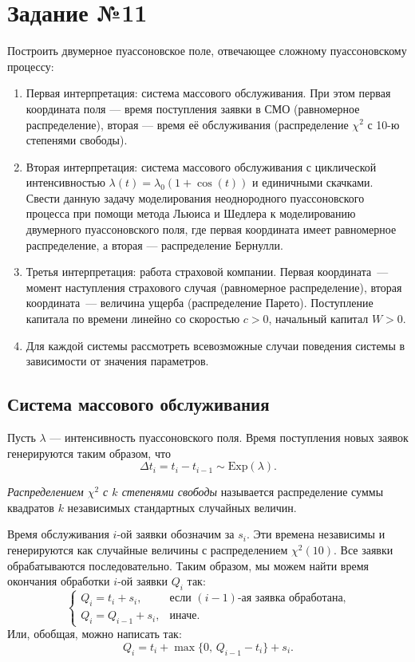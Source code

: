 \section{Задание №11}

Построить двумерное пуассоновское поле, отвечающее сложному пуассоновскому процессу:
\begin{enumerate}
        \item Первая интерпретация: система массового обслуживания. При этом первая координата поля --- время поступления заявки в СМО (равномерное распределение), вторая --- время её обслуживания (распределение $\chi^2$ с 10-ю степенями свободы).
        \item Вторая интерпретация: система массового обслуживания с циклической интенсивностью $\lambda(t) = \lambda_0 (1 + \cos(t))$ и единичными скачками. Свести данную задачу моделирования неоднородного пуассоновского процесса при помощи метода Льюиса и Шедлера к моделированию двумерного пуассоновского поля, где первая координата имеет равномерное распределение, а вторая --- распределение Бернулли.
        \item Третья интерпретация: работа страховой компании. Первая координата~--- момент наступления страхового случая (равномерное распределение), вторая координата~--- величина ущерба (распределение Парето). Поступление капитала по времени линейно со скоростью $c > 0$, начальный капитал $W > 0$.
        \item Для каждой системы рассмотреть всевозможные случаи поведения системы в зависимости от значения параметров.
\end{enumerate}


\subsection{Система массового обслуживания}

Пусть $\lambda$ --- интенсивность пуассоновского поля. Время поступления новых заявок генерируются таким образом, что
$$
        \Delta t_i = t_i - t_{i-1}
        \sim
        \mathrm{Exp}(\lambda).
$$

\begin{definition}
        \textit{Распределением $\chi^2$ с $k$ степенями свободы} называется распределение суммы квадратов $k$ независимых стандартных случайных величин.
\end{definition}

Время обслуживания $i$-ой заявки обозначим за $s_i$. Эти времена независимы и генерируются как случайные величины с распределением $\chi^2(10)$. Все заявки обрабатываются последовательно. Таким образом, мы можем найти время окончания обработки $i$-ой заявки $Q_i$ так:
$$
        \begin{cases}
Q_i = t_i + s_i, 
        &
\mbox{если $(i-1)$-ая заявка обработана,}
        \\
Q_i = Q_{i-1} + s_i,
        &
\mbox{иначе.}
        \end{cases}
$$
Или, обобщая, можно написать так:
$$
        Q_i
        =
        t_i
        +
        \max\{0,\,Q_{i-1} - t_i\}
        +
        s_i.
$$

